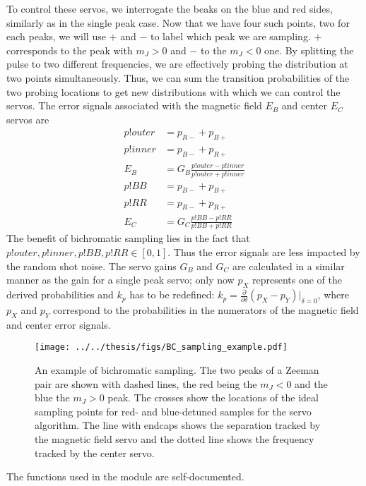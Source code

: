 \documentclass[a4paper,12pt]{article}
\newcommand{\pd}[2]{\frac{\partial #1}{\partial #2}}
\begin{document}
To control these servos, we interrogate the beaks on the blue and
red sides, similarly as in the single peak case.
Now that we have four such points, two for each peaks, we will use $+$ and $-$
to label which peak we are sampling.
$+$ corresponds to the peak with $m_J > 0$ and $-$ to the $m_J < 0$ one.
By splitting the pulse to two different frequencies, we are effectively
probing the distribution at two points simultaneously.
Thus, we can sum the transition probabilities of the two probing locations
to get new distributions with which we can control the servos.
The error signals associated with the magnetic field $E_B$ and center $E_C$ 
servos are
\begin{align}
  p!{outer} &= p_{R-} + p_{B+} \\
  p!{inner} &= p_{B-} + p_{R+} \\
  E_B &= G_B \frac{p!{outer} - p!{inner}}{p!{outer} + p!{inner}} \\
  p!{BB} &= p_{B-} + p_{B+} \\
  p!{RR} &= p_{R-} + p_{R+} \\
  E_C &= G_C \frac{p!{BB} - p!{RR}}{p!{BB} + p!{RR}} 
\end{align} 
The benefit of bichromatic sampling lies in the fact that $p!{outer}, p!{inner},
p!{BB}, p!{RR} \in [0,1]$.
Thus the error signals are less impacted by the random shot noise.
The servo gains $G_B$ and $G_C$ are calculated in a similar manner as the gain
for a single peak servo; only now $p_X$ represents one of the derived probabilities
and $k_p$ has to be redefined: $k_p = \pd{}{\delta} (p_X - p_Y) |_{\delta=0}$, where
$p_X$ and $p_Y$ correspond to the probabilities in the numerators of the
magnetic field and center error signals.

\begin{figure}
  \texttt{[image: ../../thesis/figs/BC\_sampling\_example.pdf]}
  \centering
  \caption{
    An example of bichromatic sampling.
    The two peaks of a Zeeman pair are shown with dashed lines, the red being
    the $m_J < 0$ and the blue the $m_J > 0$ peak.
    The crosses show the locations of the ideal sampling points for red- and
    blue-detuned samples for the servo algorithm.
    The line with endcaps shows the separation tracked by the magnetic field
    servo and the dotted line shows the frequency tracked by the center servo.
  }
  \label{fig:BC_example}
\end{figure}

The functions used in the module are self-documented.
\end{document}
